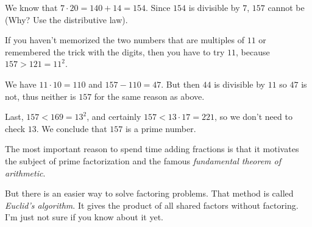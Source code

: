 \documentclass[11pt, oneside]{article}
\begin{document}
We know that $7 \cdot 20 = 140 + 14 = 154$.  Since $154$ is divisible by $7$, $157$ cannot be (Why?  Use the distributive law).

If you haven't memorized the two numbers that are multiples of $11$ or remembered the trick with the digits, then you have to try $11$, because $157 > 121 = 11^2$.  

We have $11 \cdot 10 = 110$ and $157 - 110 = 47$.  But then $44$ is divisible by $11$ so $47$ is not, thus neither is $157$ for the same reason as above.

Last, $157 < 169 = 13^2$, and certainly $157 < 13 \cdot 17 = 221$, so we don't need to check $13$.  We conclude that $157$ is a prime number.

The most important reason to spend time adding fractions is that it motivates the subject of prime factorization and the famous \emph{fundamental theorem of arithmetic}.  

But there is an easier way to solve factoring problems.  That method is called \emph{Euclid's algorithm}.  It gives the product of all shared factors without factoring.  I'm just not sure if you know about it yet.
\end{document}
